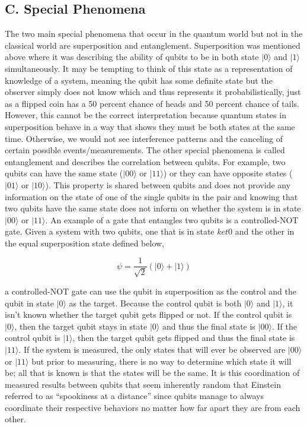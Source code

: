 \documentclass[
	a4paper, %
	10pt, %
	unnumberedsections, %
	twoside, %
]{LTJournalArticle}
\newcommand{\ket}[1]{\lvert#1\rangle} %
\begin{document}
\subsection{C. Special Phenomena}
The two main special phenomena that occur in the quantum world but not in the classical world are superposition and entanglement. Superposition was mentioned above where it was 
describing the ability of qubits to be in both state $\ket{0}$ and $\ket{1}$ simultaneously. It may be tempting to think of this state as a representation of knowledge of a system, 
meaning the qubit has some definite state but the observer simply does not know which and thus represents it probabilistically, just as a flipped coin has a 50 percent chance of 
heads and 50 percent chance of tails. However, this cannot be the correct interpretation because quantum states in superposition behave in a way that shows they must be both states 
at the same time. Otherwise, we would not see interference patterns and the canceling of certain possible events/measurements. The other special phenomena is called entanglement and 
describes the correlation between qubits. For example, two qubits can have the same state ($\ket{00}$ or $\ket{11}$) or they can have opposite states ($\ket{01}$ or $\ket{10}$). This 
property is shared between qubits and does not provide any information on the state of one of the single qubits in the pair and knowing that two qubits have the same state does not 
inform on whether the system is in state $\ket{00}$ or $\ket{11}$. An example of a gate that entangles two qubits is a controlled-NOT gate. Given a system with two qubits, one that 
is in state $ket{0}$ and the other in the equal superposition state defined below, 

\begin{equation}
	\psi =\frac{1}{\sqrt{2}}(\ket{0} + \ket{1})
	\label{eq:superposition}
\end{equation}

a controlled-NOT gate can use the qubit in superposition as the control and the qubit in state $\ket{0}$ as the target. Because the control qubit is both $\ket{0}$ and $\ket{1}$, it 
isn't known whether the target qubit gets flipped or not. If the control qubit is $\ket{0}$, then the target qubit stays in state $\ket{0}$ and thus the final state is $\ket{00}$. 
If the control qubit is $\ket{1}$, then the target qubit gets flipped and thus the final state is $\ket{11}$. If the system is measured, the only states that will ever be observed 
are $\ket{00}$ or $\ket{11}$ but prior to measuring, there is no way to determine which state it will be; all that is known is that the states will be the same. It is this coordination 
of measured results between qubits that seem inherently random that Einstein referred to as “spookiness at a distance” since qubits manage to always coordinate their respective behaviors 
no matter how far apart they are from each other.
\end{document}
